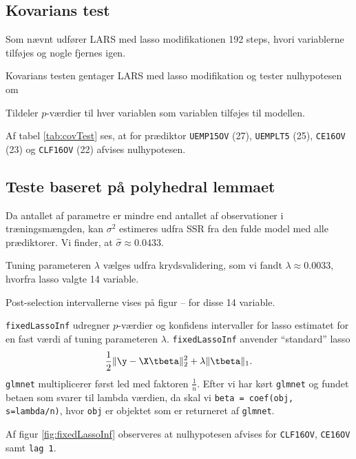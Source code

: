 \newpage
\subsection{Kovarians test}
Som nævnt udfører LARS med lasso modifikationen 192 steps, hvori variablerne tilføjes og nogle fjernes igen.

Kovarians testen gentager LARS med lasso modifikation og tester nulhypotesen om 

Tildeler \(p\)-værdier til hver variablen som variablen tilføjes til modellen.


Af tabel \ref{tab:covTest} ses, at for prædiktor \texttt{UEMP15OV} (27), \texttt{UEMPLT5} (25), \texttt{CE16OV} (23) og \texttt{CLF16OV} (22) afvises nulhypotesen.




\newpage
\subsection{Teste baseret på polyhedral lemmaet}

Da antallet af parametre er mindre end antallet af observationer i træningsmængden, kan \(\sigma^2\) estimeres udfra SSR fra den fulde model med alle prædiktorer.
Vi finder, at \(\widehat{\sigma} \approx 0.0433\).

Tuning parameteren \(\lambda\) vælges udfra krydsvalidering, som vi fandt \(\lambda \approx 0.0033\), hvorfra lasso valgte 14 variable.




Post-selection intervallerne vises på figur -- for disse 14 variable.


\texttt{fixedLassoInf} udregner \(p\)-værdier og konfidens intervaller for lasso estimatet for en fast værdi af tuning parameteren \(\lambda\).
\texttt{fixedLassoInf} anvender ``standard'' lasso
\begin{align*}
\frac{1}{2} \Vert \y - \X \tbeta \Vert_2^2 + \lambda \Vert \tbeta \Vert_1.
\end{align*}
\texttt{glmnet} multiplicerer først led med faktoren \(\frac{1}{n}\).
Efter vi har kørt \texttt{glmnet} og fundet betaen som svarer til lambda værdien, da skal vi \texttt{beta = coef(obj, s=lambda/n)}, hvor \texttt{obj} er objektet som er returneret af \texttt{glmnet}.


Af figur \ref{fig:fixedLassoInf} observeres at nulhypotesen afvises for \texttt{CLF16OV}, \texttt{CE16OV} samt \texttt{lag 1}.



